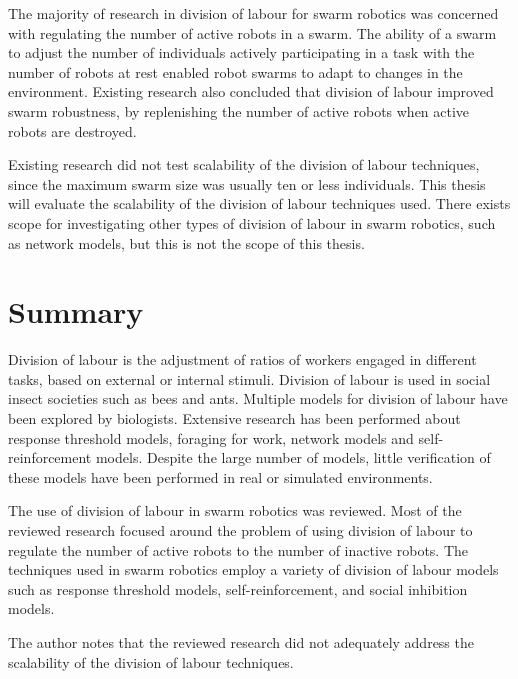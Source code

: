 The majority of research in division of labour for swarm robotics was concerned with regulating the number of active robots in a swarm. The ability of a swarm to adjust the number of individuals actively participating in a task with the number of robots at rest enabled robot swarms to adapt to changes in the environment. Existing research also concluded that division of labour improved swarm robustness, by replenishing the number of active robots when active robots are destroyed. 

Existing research did not test scalability of the division of labour techniques, since the maximum swarm size was usually ten or less individuals. This thesis will evaluate the scalability of the division of labour techniques used. There exists scope for investigating other types of division of labour in swarm robotics, such as network models, but this is not the scope of this thesis. 


\section{Summary}
\label{sec:second:summary}
Division of labour is the adjustment of ratios of workers engaged in different tasks, based on external or internal stimuli. Division of labour is used in social insect societies such as bees and ants. Multiple models for division of labour have been explored by biologists. Extensive research has been performed about response threshold models, foraging for work, network models and self-reinforcement models. Despite the large number of models, little verification of these models have been performed in real or simulated environments. 

The use of division of labour in swarm robotics was reviewed. Most of the reviewed research focused around the problem of using division of labour to regulate the number of active robots to the number of inactive robots. The techniques used in swarm robotics employ a variety of division of labour models such as response threshold models, self-reinforcement, and social inhibition models. 

The author notes that the reviewed research did not adequately address the scalability of the division of labour techniques.
